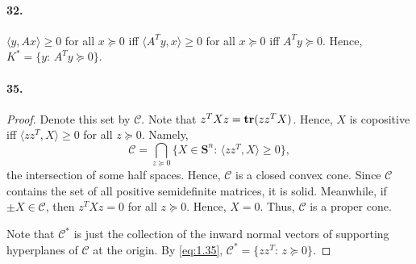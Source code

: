   \paragraph{32.}
  \begin{solution}
    $\langle y,Ax\rangle\ge 0$ for all $x\succeq 0$ iff $\langle A^Ty,x\rangle
    \ge 0$ for all $x\succeq 0$ iff $A^Ty\succeq 0$. Hence, $K^*=\{y:\, A^Ty
    \succeq 0\}$.
  \end{solution}
  
  \paragraph{35.}
  \begin{proof}
    Denote this set by $\mathcal{C}$. Note that $z^TXz=\operatorname{\mathbf{tr}}(zz^TX)$. Hence, $X$
    is copositive iff $\langle zz^T,X\rangle\ge 0$ for all $z\succeq 0$. Namely,
    \begin{equation}
      \label{eq:1.35}
      \mathcal{C}=
      \bigcap_{z\succeq 0}\{X\in\mathbf{S}^n:\, \langle zz^T,X\rangle\ge 0\},
    \end{equation}
    the intersection of some half spaces. Hence, $\mathcal{C}$ is a closed 
    convex cone. Since $\mathcal{C}$ contains the set of all positive 
    semidefinite matrices, it is solid. Meanwhile, if $\pm X\in\mathcal{C}$, 
    then $z^TXz=0$ for all $z\succeq 0$. Hence, $X=0$. Thus, $\mathcal{C}$ is a
    proper cone.\par
    Note that $\mathcal{C}^*$ is just the collection of the inward normal 
    vectors of supporting hyperplanes of $\mathcal{C}$ at the origin. By
    \eqref{eq:1.35}, $\mathcal{C}^*=\{zz^T:\, z\succeq 0\}$.
  \end{proof}


























